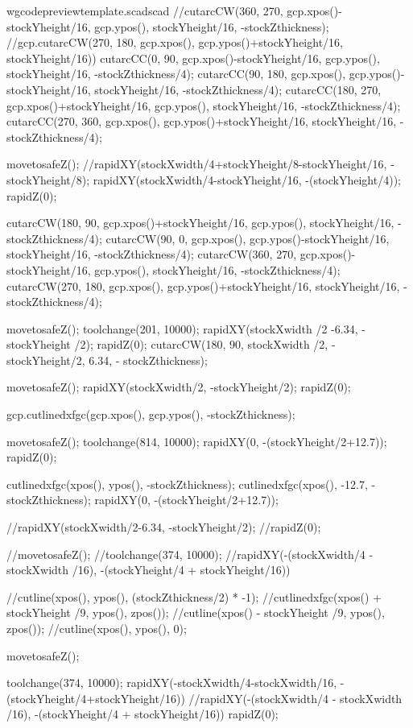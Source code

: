 \documentclass{ltxdoc}
\begin{document}
\begin{writecode}{w}{gcodepreviewtemplate.scad}{scad}
//cutarcCW(360, 270, gcp.xpos()-stockYheight/16, gcp.ypos(), stockYheight/16, -stockZthickness);
//gcp.cutarcCW(270, 180, gcp.xpos(), gcp.ypos()+stockYheight/16, stockYheight/16))
cutarcCC(0, 90, gcp.xpos()-stockYheight/16, gcp.ypos(), stockYheight/16, -stockZthickness/4);
cutarcCC(90, 180, gcp.xpos(), gcp.ypos()-stockYheight/16, stockYheight/16, -stockZthickness/4);
cutarcCC(180, 270, gcp.xpos()+stockYheight/16, gcp.ypos(), stockYheight/16, -stockZthickness/4);
cutarcCC(270, 360, gcp.xpos(), gcp.ypos()+stockYheight/16, stockYheight/16, -stockZthickness/4);

movetosafeZ();
//rapidXY(stockXwidth/4+stockYheight/8-stockYheight/16, -stockYheight/8);
rapidXY(stockXwidth/4-stockYheight/16, -(stockYheight/4));
rapidZ(0);

cutarcCW(180, 90, gcp.xpos()+stockYheight/16, gcp.ypos(), stockYheight/16, -stockZthickness/4);
cutarcCW(90, 0, gcp.xpos(), gcp.ypos()-stockYheight/16, stockYheight/16, -stockZthickness/4);
cutarcCW(360, 270, gcp.xpos()-stockYheight/16, gcp.ypos(), stockYheight/16, -stockZthickness/4);
cutarcCW(270, 180, gcp.xpos(), gcp.ypos()+stockYheight/16, stockYheight/16, -stockZthickness/4);

movetosafeZ();
toolchange(201, 10000);
rapidXY(stockXwidth /2 -6.34, - stockYheight /2);
rapidZ(0);
cutarcCW(180, 90, stockXwidth /2, -stockYheight/2, 6.34, - stockZthickness);

movetosafeZ();
rapidXY(stockXwidth/2, -stockYheight/2);
rapidZ(0);

gcp.cutlinedxfgc(gcp.xpos(), gcp.ypos(), -stockZthickness);

movetosafeZ();
toolchange(814, 10000);
rapidXY(0, -(stockYheight/2+12.7));
rapidZ(0);

cutlinedxfgc(xpos(), ypos(), -stockZthickness);
cutlinedxfgc(xpos(), -12.7, -stockZthickness);
rapidXY(0, -(stockYheight/2+12.7));

//rapidXY(stockXwidth/2-6.34, -stockYheight/2);
//rapidZ(0);

//movetosafeZ();
//toolchange(374, 10000);
//rapidXY(-(stockXwidth/4 - stockXwidth /16), -(stockYheight/4 + stockYheight/16))

//cutline(xpos(), ypos(), (stockZthickness/2) * -1);
//cutlinedxfgc(xpos() + stockYheight /9, ypos(), zpos());
//cutline(xpos() - stockYheight /9, ypos(), zpos());
//cutline(xpos(), ypos(), 0);

movetosafeZ();

toolchange(374, 10000);
rapidXY(-stockXwidth/4-stockXwidth/16, -(stockYheight/4+stockYheight/16))
//rapidXY(-(stockXwidth/4 - stockXwidth /16), -(stockYheight/4 + stockYheight/16))
rapidZ(0);


\end{writecode}
\end{document}
